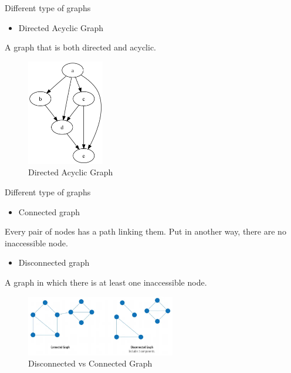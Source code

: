 \documentclass[ignorenonframetext,]{beamer}
\providecommand{\tightlist}{%
  \setlength{\itemsep}{0pt}\setlength{\parskip}{0pt}}
\begin{document}
\begin{frame}{Different type of graphs}
\protect\hypertarget{different-type-of-graphs-2}{}

\begin{itemize}
\tightlist
\item
  Directed Acyclic Graph
\end{itemize}

A graph that is both directed and acyclic.

\begin{figure}
\centering
\includegraphics[width=\textwidth,height=1.82292in]{dag.png}
\caption{Directed Acyclic Graph}
\end{figure}

\end{frame}

\begin{frame}{Different type of graphs}
\protect\hypertarget{different-type-of-graphs-3}{}

\begin{itemize}
\tightlist
\item
  Connected graph
\end{itemize}

Every pair of nodes has a path linking them. Put in another way, there
are no inaccessible node.

\begin{itemize}
\tightlist
\item
  Disconnected graph
\end{itemize}

A graph in which there is at least one inaccessible node.

\begin{figure}
\centering
\includegraphics[width=\textwidth,height=1.04167in]{disconnected-connected.png}
\caption{Disconnected vs Connected Graph}
\end{figure}

\end{frame}
\end{document}
